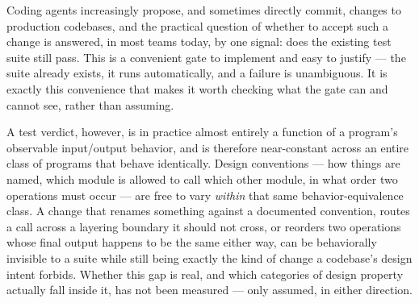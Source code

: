 \documentclass[11pt]{article}
\begin{document}
Coding agents increasingly propose, and sometimes directly commit, changes to production codebases, and the practical question of whether to accept such a change is answered, in most teams today, by one signal: does the existing test suite still pass. This is a convenient gate to implement and easy to justify --- the suite already exists, it runs automatically, and a failure is unambiguous. It is exactly this convenience that makes it worth checking what the gate can and cannot see, rather than assuming.

A test verdict, however, is in practice almost entirely a function of a program's observable input/output behavior, and is therefore near-constant across an entire class of programs that behave identically. Design conventions --- how things are named, which module is allowed to call which other module, in what order two operations must occur --- are free to vary \emph{within} that same behavior-equivalence class. A change that renames something against a documented convention, routes a call across a layering boundary it should not cross, or reorders two operations whose final output happens to be the same either way, can be behaviorally invisible to a suite while still being exactly the kind of change a codebase's design intent forbids. Whether this gap is real, and which categories of design property actually fall inside it, has not been measured --- only assumed, in either direction.
\end{document}
